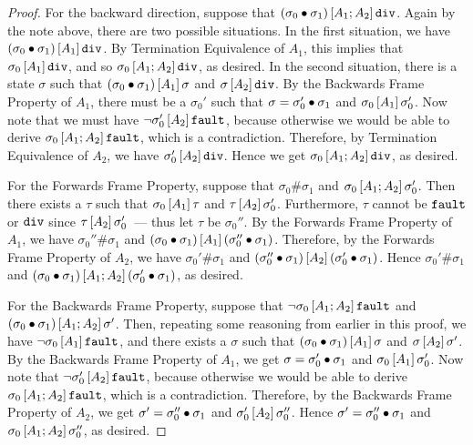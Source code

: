 \begin{proof}
For the backward direction, suppose that $\relatebr{A_1;A_2}{(\sigma_0 \dt \sigma_1)}{\dvg}$.  
Again by the note above, there are two
possible situations. In the first situation, we have
$\relatebr{A_1}{(\sigma_0 \dt \sigma_1)}{\dvg}$. By Termination
Equivalence of $A_1$, this implies that
$\relatebr{A_1}{\sigma_0}{\dvg}$, and so
$\relatebr{A_1;A_2}{\sigma_0}{\dvg}$, as desired. In the second
situation, there is a state $\sigma$ such that $\relatebr{A_1}{(\sigma_0 \dt \sigma_1)}{\sigma}$ 
and $\relatebr{A_2}{\sigma}{\dvg}$. By the
Backwards Frame Property of $A_1$, there must be a $\sigma_0'$ such
that $\sigma = \sigma_0' \dt \sigma_1$ and
$\relatebr{A_1}{\sigma_0}{\sigma_0'}$. Now note that we must have $\lnot
\relatebr{A_2}{\sigma_0'}{\fault}$, because otherwise we would be able
to derive $\relatebr{A_1;A_2}{\sigma_0}{\fault}$, which is a
contradiction. Therefore, by Termination Equivalence of $A_2$, we have
$\relatebr{A_2}{\sigma_0'}{\dvg}$. Hence we get
$\relatebr{A_1;A_2}{\sigma_0}{\dvg}$, as desired.

For the Forwards Frame Property, suppose that $\sigma_0 \# \sigma_1$
and $\relatebr{A_1;A_2}{\sigma_0}{\sigma_0'}$.  Then there exists a
$\tau$ such that $\relatebr{A_1}{\sigma_0}{\tau}$ and
$\relatebr{A_2}{\tau}{\sigma_0'}$.  Furthermore, $\tau$ cannot be
$\fault$ or $\dvg$ since $\relatebr{A_2}{\tau}{\sigma_0'}$~--- thus let
$\tau$ be $\sigma_0''$. By the Forwards Frame Property of $A_1$, we
have $\sigma_0'' \# \sigma_1$ and $\relatebr{A_1}{(\sigma_0 \dt
  \sigma_1)}{(\sigma_0'' \dt \sigma_1)}$. Therefore, by the Forwards
Frame Property of $A_2$, we have $\sigma_0' \# \sigma_1$ and
$\relatebr{A_2}{(\sigma_0'' \dt \sigma_1)}{(\sigma_0' \dt \sigma_1)}$.
Hence $\sigma_0' \# \sigma_1$ and $\relatebr{A_1;A_2}{(\sigma_0 \dt
  \sigma_1)}{(\sigma_0' \dt \sigma_1)}$, as desired.

For the Backwards Frame Property, suppose that $\lnot
\relatebr{A_1;A_2}{\sigma_0}{\fault}$ and $\relatebr{A_1;A_2}{(\sigma_0
  \dt \sigma_1)}{\sigma'}$. Then, repeating some reasoning from
earlier in this proof, we have $\lnot \relatebr{A_1}{\sigma_0}{\fault}$,
and there exists a $\sigma$ such that $\relatebr{A_1}{(\sigma_0 \dt
  \sigma_1)}{\sigma}$ and $\relatebr{A_2}{\sigma}{\sigma'}$. By the
Backwards Frame Property of $A_1$, we get $\sigma = \sigma_0' \dt
\sigma_1$ and $\relatebr{A_1}{\sigma_0}{\sigma_0'}$. Now note that
$\lnot \relatebr{A_2}{\sigma_0'}{\fault}$, because otherwise we would be
able to derive $\relatebr{A_1;A_2}{\sigma_0}{\fault}$, which is a
contradiction. Therefore, by the Backwards Frame Property of $A_2$, we
get $\sigma' = \sigma_0'' \dt \sigma_1$ and
$\relatebr{A_2}{\sigma_0'}{\sigma_0''}$. Hence $\sigma' = \sigma_0'' \dt
\sigma_1$ and $\relatebr{A_1;A_2}{\sigma_0}{\sigma_0''}$, as desired.
\end{proof}
\fi

